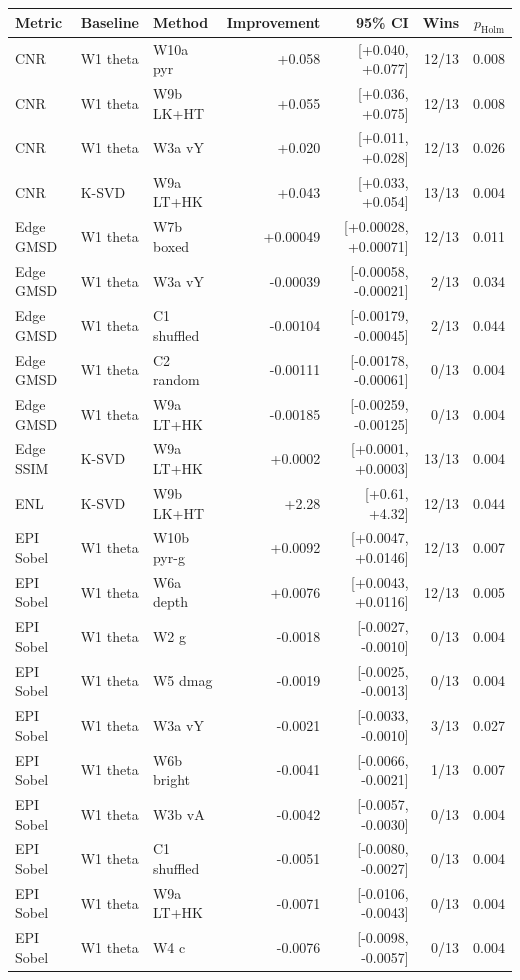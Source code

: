 \begin{tabular}{lllrrrr}
\toprule
Metric & Baseline & Method & Improvement & 95\% CI & Wins & $p_{\mathrm{Holm}}$ \\
\midrule
CNR & W1 theta & W10a pyr & +0.058 & [+0.040, +0.077] & 12/13 & 0.008 \\
CNR & W1 theta & W9b LK+HT & +0.055 & [+0.036, +0.075] & 12/13 & 0.008 \\
CNR & W1 theta & W3a vY & +0.020 & [+0.011, +0.028] & 12/13 & 0.026 \\
CNR & K-SVD & W9a LT+HK & +0.043 & [+0.033, +0.054] & 13/13 & 0.004 \\
Edge GMSD & W1 theta & W7b boxed & +0.00049 & [+0.00028, +0.00071] & 12/13 & 0.011 \\
Edge GMSD & W1 theta & W3a vY & -0.00039 & [-0.00058, -0.00021] & 2/13 & 0.034 \\
Edge GMSD & W1 theta & C1 shuffled & -0.00104 & [-0.00179, -0.00045] & 2/13 & 0.044 \\
Edge GMSD & W1 theta & C2 random & -0.00111 & [-0.00178, -0.00061] & 0/13 & 0.004 \\
Edge GMSD & W1 theta & W9a LT+HK & -0.00185 & [-0.00259, -0.00125] & 0/13 & 0.004 \\
Edge SSIM & K-SVD & W9a LT+HK & +0.0002 & [+0.0001, +0.0003] & 13/13 & 0.004 \\
ENL & K-SVD & W9b LK+HT & +2.28 & [+0.61, +4.32] & 12/13 & 0.044 \\
EPI Sobel & W1 theta & W10b pyr-g & +0.0092 & [+0.0047, +0.0146] & 12/13 & 0.007 \\
EPI Sobel & W1 theta & W6a depth & +0.0076 & [+0.0043, +0.0116] & 12/13 & 0.005 \\
EPI Sobel & W1 theta & W2 g & -0.0018 & [-0.0027, -0.0010] & 0/13 & 0.004 \\
EPI Sobel & W1 theta & W5 dmag & -0.0019 & [-0.0025, -0.0013] & 0/13 & 0.004 \\
EPI Sobel & W1 theta & W3a vY & -0.0021 & [-0.0033, -0.0010] & 3/13 & 0.027 \\
EPI Sobel & W1 theta & W6b bright & -0.0041 & [-0.0066, -0.0021] & 1/13 & 0.007 \\
EPI Sobel & W1 theta & W3b vA & -0.0042 & [-0.0057, -0.0030] & 0/13 & 0.004 \\
EPI Sobel & W1 theta & C1 shuffled & -0.0051 & [-0.0080, -0.0027] & 0/13 & 0.004 \\
EPI Sobel & W1 theta & W9a LT+HK & -0.0071 & [-0.0106, -0.0043] & 0/13 & 0.004 \\
EPI Sobel & W1 theta & W4 c & -0.0076 & [-0.0098, -0.0057] & 0/13 & 0.004 \\

\end{tabular}

